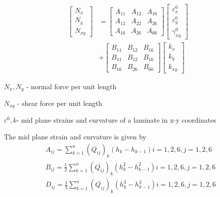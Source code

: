 \begin{equation} \label{eq:force_and_moments}
	\begin{array}{ll}
	\begin{bmatrix}
		N_x \\
		N_y \\
		N_{xy}
	\end{bmatrix}
	&=
	\begin{bmatrix}
		A_{11} & A_{12} & A_{16} \\
		A_{12} & A_{22} & A_{26} \\
		A_{16} & A_{26} & A_{66} 
	\end{bmatrix}
    \begin{bmatrix}
		\varepsilon_x^0 \\
        \varepsilon_y^0 \\
		\gamma_{xy}^0
    \end{bmatrix}   \\
	&+               
	\begin{bmatrix}
		B_{11} & B_{12} & B_{16} \\
		B_{11} & B_{12} & B_{16} \\
		B_{16} & B_{26} & B_{66} 
	\end{bmatrix}
	\begin{bmatrix}
		k_x \\
		k_y \\
		k_{xy} 
	\end{bmatrix}   
	\end{array}
\end{equation}

$N_x,N_y $  - normal force per unit length

$N_{xy} $  - shear force per unit length

$\varepsilon^{0}, k $- mid plane strains and curvature of a laminate in x-y coordinates

The mid plane strain and curvature is given by
\begin{equation}
    \begin{split}
    &A_{ij}=\sum_{k=1}^{n}(\overline{Q_{ij}})_k(h_k-h_{k-1})  i=1,2,6, j=1,2,6\\
    &B_{ij}=\frac{1}{2}\sum_{k=1}^{n}(\overline{Q_{ij}})_k(h_k^2 - h_{k-1}^2)  i=1,2,6, j=1,2,6\\
    &D_{ij}=\frac{1}{3}\sum_{k=1}^{n}(\overline{Q_{ij}})_k(h_k^3 - h_{k-1}^3) i=1,2,6, j=1,2,6\\
    \end{split}
\end{equation}

